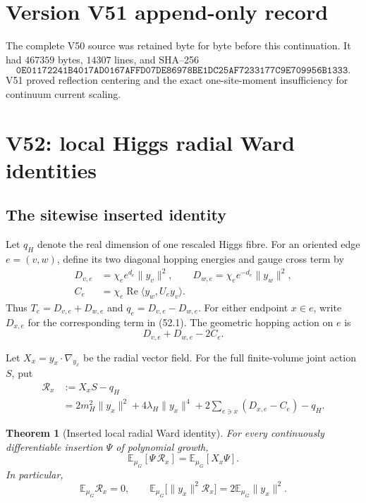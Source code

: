 \documentclass[11pt]{article}
\newtheorem{theorem}{Theorem}[section]
\theoremstyle{remark}
\begin{document}
\section*{Version V51 append-only record}
The complete V50 source was retained byte for byte before this
continuation.  It had \(467359\) bytes, \(14307\) lines, and SHA--256
\[
 \texttt{0E01172241B4017AD0167AFFD07DE86978BE1DC25AF7233177C9E709956B1333}.
\]
V51 proved reflection centering and the exact one-site-moment
insufficiency for continuum current scaling.


\section{V52: local Higgs radial Ward identities}
\label{sec:v17v52}

\subsection{The sitewise inserted identity}

Let \(q_H\) denote the real dimension of one rescaled Higgs fibre.
For an oriented edge \(e=(v,w)\), define its two diagonal hopping
energies and gauge cross term by
\[
\begin{aligned}
 D_{v,e}&=\chi_e e^{d_e}\|y_v\|^2,\qquad
 D_{w,e}=\chi_e e^{-d_e}\|y_w\|^2,\\
 C_e&=\chi_e\operatorname{Re}
 \langle y_w,U_ey_v\rangle.                       \tag{52.1}
\end{aligned}
\]
Thus \(T_e=D_{v,e}+D_{w,e}\) and \(q_e=D_{v,e}-D_{w,e}\).
For either endpoint \(x\in e\), write \(D_{x,e}\) for the
corresponding term in (52.1).  The geometric hopping action on \(e\)
is
\[
 D_{v,e}+D_{w,e}-2C_e.                            \tag{52.2}
\]

Let \(X_x=y_x\mathbin{\cdot}\nabla_{y_x}\) be the radial vector field.
For the full finite-volume joint action \(S\), put
\[
\begin{aligned}
 \mathscr R_x
 &:=
 X_xS-q_H\\
 &=
 2m_H^2\|y_x\|^2+4\lambda_H\|y_x\|^4
 +2\sum_{e\ni x}(D_{x,e}-C_e)-q_H.                \tag{52.3}
\end{aligned}
\]

\begin{theorem}[Inserted local radial Ward identity]
\label{thm:v17v52-ward}
For every continuously differentiable insertion \(\Psi\) of polynomial
growth,
\[
\boxed{
 \mathbb E_{\mu_G}[\Psi\,\mathscr R_x]
 =
 \mathbb E_{\mu_G}[X_x\Psi].}                     \tag{52.4}
\]
In particular,
\[
 \mathbb E_{\mu_G}\mathscr R_x=0,\qquad
 \mathbb E_{\mu_G}
 \bigl[\|y_x\|^2\mathscr R_x\bigr]
 =
 2\mathbb E_{\mu_G}\|y_x\|^2.                     \tag{52.5}
\]
\end{theorem}
\end{document}
